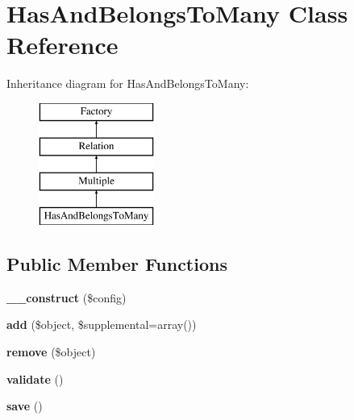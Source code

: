 \hypertarget{classHasAndBelongsToMany}{
\section{HasAndBelongsToMany Class Reference}
\label{classHasAndBelongsToMany}
}
Inheritance diagram for HasAndBelongsToMany:\begin{figure}[H]
\begin{center}
\leavevmode
\includegraphics[height=4.000000cm]{classHasAndBelongsToMany}
\end{center}
\end{figure}
\subsection*{Public Member Functions}
\begin{DoxyCompactItemize}
\item 
\hypertarget{classHasAndBelongsToMany_a0b1e1fe55fb8ebacb93ce01993457374}{
{\bfseries \_\-\_\-construct} (\$config)}
\label{classHasAndBelongsToMany_a0b1e1fe55fb8ebacb93ce01993457374}

\item 
\hypertarget{classHasAndBelongsToMany_a3534b3b143fba5ac01539431b132299a}{
{\bfseries add} (\$object, \$supplemental=array())}
\label{classHasAndBelongsToMany_a3534b3b143fba5ac01539431b132299a}

\item 
\hypertarget{classHasAndBelongsToMany_aa0e85f6cb40d4e001efb0b3a49e0ffec}{
{\bfseries remove} (\$object)}
\label{classHasAndBelongsToMany_aa0e85f6cb40d4e001efb0b3a49e0ffec}

\item 
\hypertarget{classHasAndBelongsToMany_ad6cf072ce9022c6fd5d5698f5743edf2}{
{\bfseries validate} ()}
\label{classHasAndBelongsToMany_ad6cf072ce9022c6fd5d5698f5743edf2}

\item 
\hypertarget{classHasAndBelongsToMany_a04044b2bcc922611f97b1ac6c99a277f}{
{\bfseries save} ()}
\label{classHasAndBelongsToMany_a04044b2bcc922611f97b1ac6c99a277f}

\end{DoxyCompactItemize}
